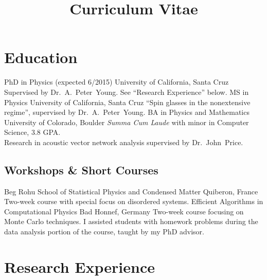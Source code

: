 \documentclass{cv}
\title{Curriculum Vitae}
\def\Peter{Dr.~A.~Peter~Young}
\def\John{Dr.~John~Price}
\begin{document}
\maketitle

\section{Education}

\begin{cvjobs}
    {PhD in Physics \textnormal{(expected 6/2015)}}
    {University of California, Santa Cruz}
    {Supervised by \Peter. See ``Research Experience'' below.}
    {MS in Physics}
    {University of California, Santa Cruz}
    {``Spin glasses in the nonextensive regime'',
     supervised by \Peter.}
    {BA in Physics and Mathematics}
    {University of Colorado, Boulder}
    {\textit{Summa Cum Laude} with minor in Computer Science, 3.8 GPA. \\
     Research in acoustic vector network analysis supervised by \John.}
\end{cvjobs}

\subsection{Workshops \& Short Courses}

\begin{cvjobs}
    {Beg Rohu School of Statistical Physics and Condensed Matter}
    {Quiberon, France}
    {Two-week course with special focus on disordered systems.}
    {Efficient Algorithms in Computational Physics}
    {Bad Honnef, Germany}
    {Two-week course focusing on Monte Carlo techniques. I assisted students with
     homework problems during the data analysis portion of the course, taught by
     my PhD advisor.} 
\end{cvjobs}

\section{Research Experience}
\end{document}
